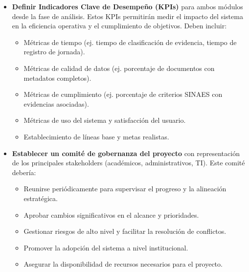 \begin{itemize}
    \item \textbf{Definir Indicadores Clave de Desempeño (KPIs)} para ambos módulos
        desde la fase de análisis. Estos KPIs permitirán medir el impacto del sistema
        en la eficiencia operativa y el cumplimiento de objetivos. Deben incluir:
        \begin{itemize}
            \item Métricas de tiempo (ej. tiempo de clasificación de evidencia, tiempo de registro de jornada).
            \item Métricas de calidad de datos (ej. porcentaje de documentos con metadatos completos).
            \item Métricas de cumplimiento (ej. porcentaje de criterios SINAES con evidencias asociadas).
            \item Métricas de uso del sistema y satisfacción del usuario.
            \item Establecimiento de líneas base y metas realistas.
        \end{itemize}

    \item \textbf{Establecer un comité de gobernanza del proyecto} con representación
        de los principales stakeholders (académicos, administrativos, TI). Este comité
        debería:
        \begin{itemize}
            \item Reunirse periódicamente para supervisar el progreso y la alineación estratégica.
            \item Aprobar cambios significativos en el alcance y prioridades.
            \item Gestionar riesgos de alto nivel y facilitar la resolución de conflictos.
            \item Promover la adopción del sistema a nivel institucional.
            \item Asegurar la disponibilidad de recursos necesarios para el proyecto.
        \end{itemize}
\end{itemize}

